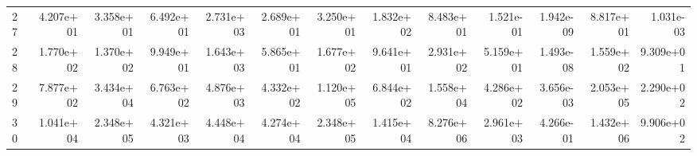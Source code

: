 \begin{table}
\begin{tabular}{lrrrrrrrrrrrr}
27 & 4.207e+01 & 3.358e+01 & 6.492e+01 & 2.731e+03 & 2.689e+01 & 3.250e+01 & 1.832e+02 & 8.483e+01 & 1.521e-01 & 1.942e-09 & 8.817e+01 & 1.031e-03 \\
28 & 1.770e+02 & 1.370e+02 & 9.949e+01 & 1.643e+03 & 5.865e+01 & 1.677e+02 & 9.641e+01 & 2.931e+02 & 5.159e+01 & 1.493e-08 & 1.559e+02 & 9.309e+01 \\
29 & 7.877e+02 & 3.434e+04 & 6.763e+02 & 4.876e+03 & 4.332e+02 & 1.120e+05 & 6.844e+02 & 1.558e+04 & 4.286e+02 & 3.656e-03 & 2.053e+05 & 2.290e+02 \\
30 & 1.041e+04 & 2.348e+05 & 4.321e+03 & 4.448e+04 & 4.274e+04 & 2.348e+05 & 1.415e+04 & 8.276e+06 & 2.961e+03 & 4.266e-01 & 1.432e+06 & 9.906e+02 \\
\bottomrule
\end{tabular}
\end{table}
